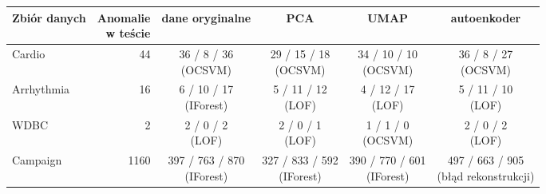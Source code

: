 \begin{tabular}{lrcccc}
\toprule
Zbiór danych & \makecell[r]{Anomalie\\w teście} & dane oryginalne & PCA & UMAP & autoenkoder \\
\midrule
Cardio & 44 & \makecell{36 / 8 / 36\\\footnotesize(OCSVM)} & \makecell{29 / 15 / 18\\\footnotesize(OCSVM)} & \makecell{34 / 10 / 10\\\footnotesize(OCSVM)} & \makecell{36 / 8 / 27\\\footnotesize(OCSVM)} \\
Arrhythmia & 16 & \makecell{6 / 10 / 17\\\footnotesize(IForest)} & \makecell{5 / 11 / 12\\\footnotesize(LOF)} & \makecell{4 / 12 / 17\\\footnotesize(LOF)} & \makecell{5 / 11 / 10\\\footnotesize(LOF)} \\
WDBC & 2 & \makecell{2 / 0 / 2\\\footnotesize(LOF)} & \makecell{2 / 0 / 1\\\footnotesize(LOF)} & \makecell{1 / 1 / 0\\\footnotesize(OCSVM)} & \makecell{2 / 0 / 2\\\footnotesize(LOF)} \\
Campaign & 1160 & \makecell{397 / 763 / 870\\\footnotesize(IForest)} & \makecell{327 / 833 / 592\\\footnotesize(IForest)} & \makecell{390 / 770 / 601\\\footnotesize(IForest)} & \makecell{497 / 663 / 905\\\footnotesize(błąd rekonstrukcji)} \\
\bottomrule
\end{tabular}
